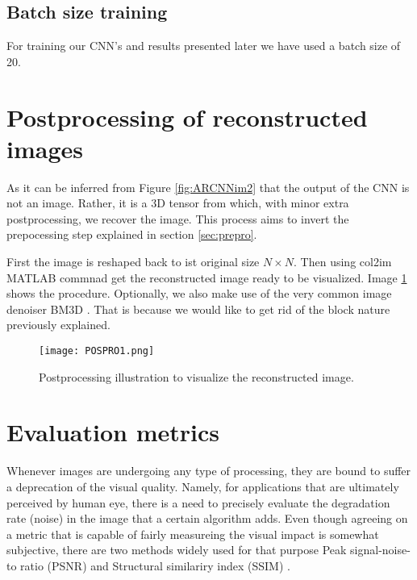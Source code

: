 \FloatBarrier

\subsection{Batch size training}  
For training our CNN's and results presented later we have used a batch size of 20. 

\FloatBarrier


\section{Postprocessing of reconstructed images}
As it can be inferred from Figure \ref{fig:ARCNNim2} that the output of the CNN is not an image. Rather, it is a 3D tensor from which, with minor extra postprocessing, we recover the image. This process aims to invert the prepocessing step explained in section \ref{sec:prepro}. 
\newline

First the image is reshaped back to ist original size $N \times N$. Then using col2im MATLAB commnad get the reconstructed image ready to be visualized. Image \ref{fig:Posproim1} shows the procedure. Optionally, we also make use of the very common image denoiser BM3D \cite{dabov2007image}. That is because we would like to get rid of the block nature previously explained. 

\begin{figure}[!htb]
\centering 
\texttt{[image: POSPRO1.png]} 
\caption[Postprocessing of recovered images ]{Postprocessing illustration to visualize the reconstructed image.}
\label{fig:Posproim1} 
\end{figure}

\FloatBarrier

\section{Evaluation metrics}
Whenever images are undergoing any type of processing, they are bound to suffer a deprecation of the visual quality. Namely, for applications that are ultimately perceived by human eye, there is a need to precisely evaluate the degradation rate (noise) in the image that a certain algorithm adds. Even though agreeing on a metric that is capable of fairly measureing the visual impact is somewhat subjective, there are two methods widely used for that purpose Peak signal-noise-to ratio (PSNR) and Structural similariry index (SSIM) \cite{wang2004image}.     

